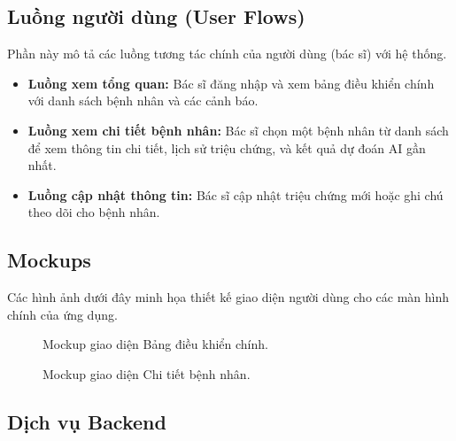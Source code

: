 \subsection{Luồng người dùng (User Flows)}
Phần này mô tả các luồng tương tác chính của người dùng (bác sĩ) với hệ thống.
\begin{itemize}
    \item \textbf{Luồng xem tổng quan:} Bác sĩ đăng nhập và xem bảng điều khiển chính với danh sách bệnh nhân và các cảnh báo.
    \item \textbf{Luồng xem chi tiết bệnh nhân:} Bác sĩ chọn một bệnh nhân từ danh sách để xem thông tin chi tiết, lịch sử triệu chứng, và kết quả dự đoán AI gần nhất.
    \item \textbf{Luồng cập nhật thông tin:} Bác sĩ cập nhật triệu chứng mới hoặc ghi chú theo dõi cho bệnh nhân.
\end{itemize}

\subsection{Mockups}
Các hình ảnh dưới đây minh họa thiết kế giao diện người dùng cho các màn hình chính của ứng dụng.

\begin{figure}[h]
    \centering
    \caption{Mockup giao diện Bảng điều khiển chính.}
    \label{fig:dashboard_mockup}
\end{figure}

\begin{figure}[h]
    \centering
    \caption{Mockup giao diện Chi tiết bệnh nhân.}
    \label{fig:patient_detail_mockup}
\end{figure}


\subsection{Dịch vụ Backend}

